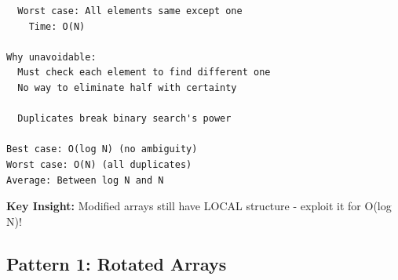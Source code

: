 \documentclass[11pt,a4paper,oneside]{book}
\begin{document}
\begin{tcolorbox}[
    enhanced,breakable,
    colback=white,
    colframe=deepblue,
    boxrule=1.5pt,
    arc=3mm,
    title=\textbf{Beyond Simple Sorted Arrays}
]
\begin{verbatim}
  Worst case: All elements same except one
    Time: O(N)

Why unavoidable:
  Must check each element to find different one
  No way to eliminate half with certainty
  
  Duplicates break binary search's power

Best case: O(log N) (no ambiguity)
Worst case: O(N) (all duplicates)
Average: Between log N and N
\end{verbatim}

\textbf{Key Insight:}
Modified arrays still have LOCAL structure - exploit it for O(log N)!
\end{tcolorbox}

\subsection{Pattern 1: Rotated Arrays}
\end{document}
